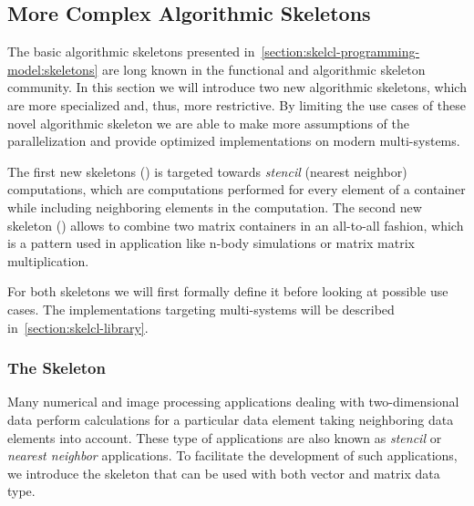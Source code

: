 \subsection{More Complex Algorithmic Skeletons}
\label{section:skelcl-programming-model:specialSkeletons}

The basic algorithmic skeletons presented in~\autoref{section:skelcl-programming-model:skeletons} are long known in the functional and algorithmic skeleton community.
In this section we will introduce two new algorithmic skeletons, which are more specialized and, thus, more restrictive.
By limiting the use cases of these novel algorithmic skeleton we are able to make more assumptions of the parallelization and provide optimized implementations on modern multi-\GPU systems.

The first new skeletons (\stencil) is targeted towards \emph{stencil} (\aka nearest neighbor) computations, which are computations performed for every element of a container while including neighboring elements in the computation.
The second new skeleton (\allpairs) allows to combine two matrix containers in an all-to-all fashion, which is a pattern used in application like n-body simulations or matrix matrix multiplication.

For both skeletons we will first formally define it before looking at possible use cases.
The implementations targeting multi-\GPU systems will be described in~\autoref{section:skelcl-library}.


\subsubsection{The \stencil Skeleton}

Many numerical and image processing applications dealing with two-dimensional data perform calculations for a particular data element taking neighboring data elements into account.
These type of applications are also known as \emph{stencil} or \emph{nearest neighbor} applications.
To facilitate the development of such applications, we introduce the \stencil skeleton that can be used with both vector and matrix data type.

